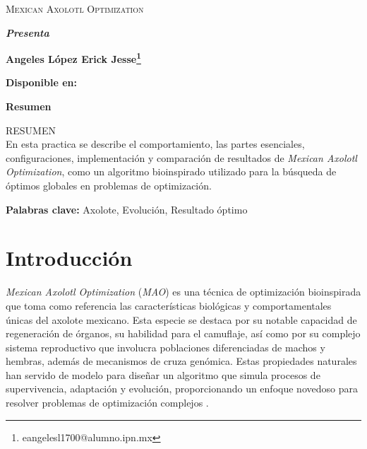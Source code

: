 \documentclass[12pt,twoside]{report}
\newcommand{\keywords}[1]{%
	\begin{center}
		\textbf{Palabras clave:} #1
	\end{center}
}
\begin{document}
	\centerline{}
	
	
	
	\begin{center}
		\Large{\textsc{Mexican Axolotl Optimization}} 
	\end{center}
	\centerline{}
	\centerline{\bf {\textit{Presenta}}}
	\centerline{}
	\centerline{\bf {Angeles López Erick Jesse\footnote{eangelesl1700@alumno.ipn.mx}}}
	\centerline{}
	\centerline{}
	\centerline{\bf {Disponible en:}}
	\centerline{}
	

	\newtheorem{Theorem}{\quad Theorem}[section]
	
	\newtheorem{Definition}[Theorem]{\quad Definition}
	
	\newtheorem{Corollary}[Theorem]{\quad Corollary}
	
	\newtheorem{Lemma}[Theorem]{\quad Lemma}
	
	\newtheorem{Example}[Theorem]{\quad Example}
	
	\bigskip
	
	\bigskip
	
	\begin{center}\textbf{Resumen}\end{center}
	
	RESUMEN \\ 
	
	En esta practica se describe el comportamiento, las partes esenciales, configuraciones, implementación y comparación de resultados de \textit{Mexican Axolotl Optimization}, como un algoritmo bioinspirado utilizado para la búsqueda de óptimos globales en problemas de optimización.
	
	\keywords{Axolote, Evolución, Resultado óptimo}
	
	\clearpage
	
	\tableofcontents
	\clearpage
	
\chapter*{Introducción}
	
	\textit{Mexican Axolotl Optimization} (\textit{MAO}) es una técnica de optimización bioinspirada que toma como referencia las características biológicas y comportamentales únicas del axolote mexicano. Esta especie se destaca por su notable capacidad de regeneración de órganos, su habilidad para el camuflaje, así como por su complejo sistema reproductivo que involucra poblaciones diferenciadas de machos y hembras, además de mecanismos de cruza genómica. Estas propiedades naturales han servido de modelo para diseñar un algoritmo que simula procesos de supervivencia, adaptación y evolución, proporcionando un enfoque novedoso para resolver problemas de optimización complejos \cite{mao}.
	
\end{document}
